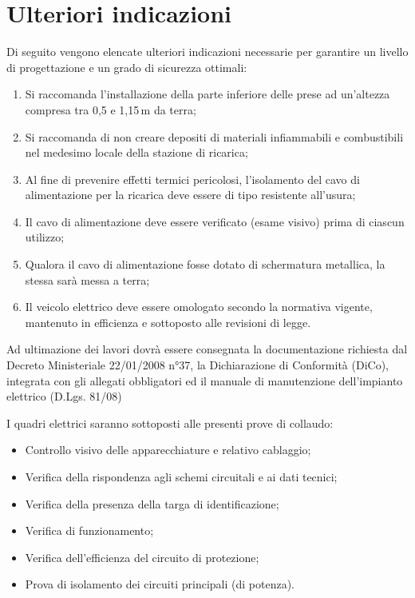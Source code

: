 \newpage
\pagestyle{fancy}

\section{Ulteriori indicazioni}
Di seguito vengono elencate ulteriori indicazioni necessarie per garantire un livello di progettazione e un grado di sicurezza ottimali:

\begin{enumerate}
\item Si raccomanda l'installazione della parte inferiore delle prese ad un'altezza compresa tra 0,5 e 1,15\,m da terra;
\item Si raccomanda di non creare depositi di materiali infiammabili e combustibili nel medesimo locale della stazione di ricarica;
\item Al fine di prevenire effetti termici pericolosi, l'isolamento del cavo di alimentazione per la ricarica deve essere di tipo resistente all'usura;
\item Il cavo di alimentazione deve essere verificato (esame visivo) prima di ciascun utilizzo;
\item Qualora il cavo di alimentazione fosse dotato di schermatura metallica, la stessa sarà messa a terra;
\item Il veicolo elettrico deve essere omologato secondo la normativa vigente, mantenuto in efficienza e sottoposto alle revisioni di legge.
\end{enumerate}

Ad ultimazione dei lavori dovrà essere consegnata la documentazione richiesta dal Decreto Ministeriale 22/01/2008 n°37, la Dichiarazione di Conformità (DiCo), integrata con gli allegati obbligatori ed il manuale di manutenzione dell’impianto elettrico (D.Lgs. 81/08)

I quadri elettrici saranno sottoposti alle presenti prove di collaudo:

\begin{itemize}
\item Controllo visivo delle apparecchiature e relativo cablaggio;
\item Verifica della rispondenza agli schemi circuitali e ai dati tecnici;
\item Verifica della presenza della targa di identificazione;
\item Verifica di funzionamento;
\item Verifica dell'efficienza del circuito di protezione;
\item Prova di isolamento dei circuiti principali (di potenza).
\end{itemize}

